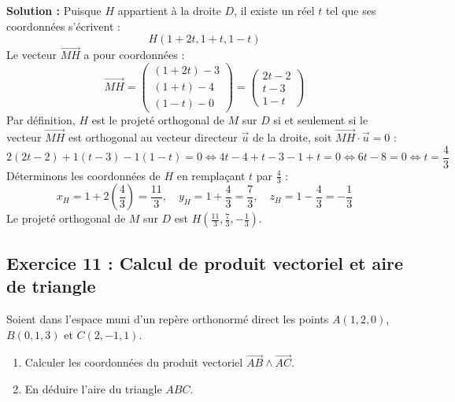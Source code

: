 \textbf{Solution :}
Puisque $H$ appartient à la droite $D$, il existe un réel $t$ tel que ses coordonnées s'écrivent :
\[
H(1 + 2t, 1 + t, 1 - t)
\]
Le vecteur $\vec{MH}$ a pour coordonnées :
\[
\vec{MH} = \begin{pmatrix} (1 + 2t) - 3 \\ (1 + t) - 4 \\ (1 - t) - 0 \end{pmatrix} = \begin{pmatrix} 2t - 2 \\ t - 3 \\ 1 - t \end{pmatrix}
\]
Par définition, $H$ est le projeté orthogonal de $M$ sur $D$ si et seulement si le vecteur $\vec{MH}$ est orthogonal au vecteur directeur $\vec{u}$ de la droite, soit $\vec{MH} \cdot \vec{u} = 0$ :
\[
2(2t - 2) + 1(t - 3) - 1(1 - t) = 0 \iff 4t - 4 + t - 3 - 1 + t = 0 \iff 6t - 8 = 0 \iff t = \frac{4}{3}
\]
Déterminons les coordonnées de $H$ en remplaçant $t$ par $\frac{4}{3}$ :
\[
x_H = 1 + 2\left(\frac{4}{3}\right) = \frac{11}{3}, \quad y_H = 1 + \frac{4}{3} = \frac{7}{3}, \quad z_H = 1 - \frac{4}{3} = -\frac{1}{3}
\]
Le projeté orthogonal de $M$ sur $D$ est $H\left(\frac{11}{3}, \frac{7}{3}, -\frac{1}{3}\right)$.

\subsection*{Exercice 11 : Calcul de produit vectoriel et aire de triangle}
Soient dans l'espace muni d'un repère orthonormé direct les points $A(1, 2, 0)$, $B(0, 1, 3)$ et $C(2, -1, 1)$.
\begin{enumerate}
    \item Calculer les coordonnées du produit vectoriel $\vec{AB} \wedge \vec{AC}$.
    \item En déduire l'aire du triangle $ABC$.
\end{enumerate}

